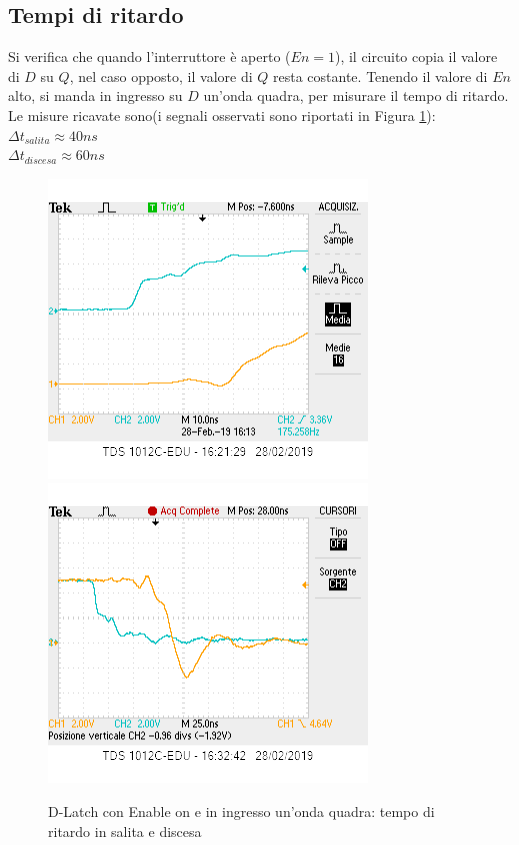 \documentclass[10pt,a4paper]{article}
\begin{document}
\subsection{Tempi di ritardo}
Si verifica che quando l'interruttore è aperto ($En=1$), il circuito copia il valore di $D$ su $Q$, nel caso opposto, il valore di $Q$ resta costante. Tenendo il valore di $En$ alto, si manda in ingresso su $D$ un'onda quadra, per misurare il tempo di ritardo. \\Le misure ricavate sono(i segnali osservati sono riportati in Figura \ref{dlatch}):\\ $\Delta t_{salita}\approx40 ns$
\\$\Delta t_{discesa}\approx60 ns$\\
\begin{figure}[h]

	\includegraphics[scale=0.7]{ritardo2.png}
	\includegraphics[scale=0.7]{ritardodiscesa2.png}
	\caption{D-Latch con Enable on e in ingresso un'onda quadra: tempo di ritardo in salita e discesa}
		\label{dlatch}
\end{figure} 
\end{document}
